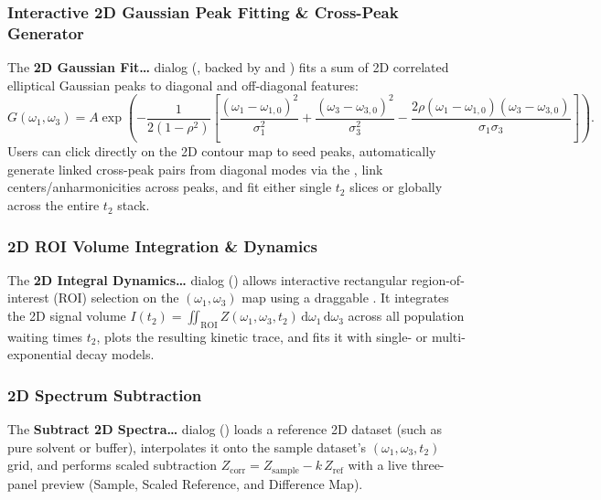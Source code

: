 \subsubsection{Interactive 2D Gaussian Peak Fitting \& Cross-Peak Generator}\label{sec:twoD:gaussian}

The \textbf{2D Gaussian Fit\ldots} dialog (, backed by  and ) fits a sum of 2D correlated elliptical Gaussian peaks to diagonal and off-diagonal features:
\begin{equation}
  G(\omega_1, \omega_3) = A \exp\!\left( -\frac{1}{2(1-\rho^2)} \left[ \frac{(\omega_1 - \omega_{1,0})^2}{\sigma_1^2} + \frac{(\omega_3 - \omega_{3,0})^2}{\sigma_3^2} - \frac{2\rho(\omega_1 - \omega_{1,0})(\omega_3 - \omega_{3,0})}{\sigma_1 \sigma_3} \right] \right).
\end{equation}
Users can click directly on the 2D contour map to seed peaks, automatically generate linked cross-peak pairs from diagonal modes via the , link centers/anharmonicities across peaks, and fit either single $t_2$ slices or globally across the entire $t_2$ stack.

\subsubsection{2D ROI Volume Integration \& Dynamics}\label{sec:twoD:integral}

The \textbf{2D Integral Dynamics\ldots} dialog () allows interactive rectangular region-of-interest (ROI) selection on the $(\omega_1, \omega_3)$ map using a draggable . It integrates the 2D signal volume $I(t_2) = \iint_{\mathrm{ROI}} Z(\omega_1, \omega_3, t_2)\,\mathrm{d}\omega_1\,\mathrm{d}\omega_3$ across all population waiting times $t_2$, plots the resulting kinetic trace, and fits it with single- or multi-exponential decay models.

\subsubsection{2D Spectrum Subtraction}\label{sec:twoD:subtraction}

The \textbf{Subtract 2D Spectra\ldots} dialog () loads a reference 2D dataset (such as pure solvent or buffer), interpolates it onto the sample dataset's $(\omega_1, \omega_3, t_2)$ grid, and performs scaled subtraction $Z_{\mathrm{corr}} = Z_{\mathrm{sample}} - k \, Z_{\mathrm{ref}}$ with a live three-panel preview (Sample, Scaled Reference, and Difference Map).
